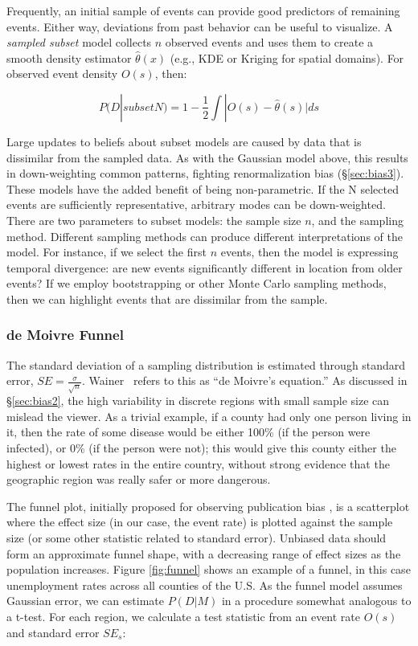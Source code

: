 \documentclass[journal]{vgtc}                %
\begin{document}
Frequently, an initial sample of events can provide good predictors of remaining events. Either way, deviations from past behavior can be useful to visualize. A \emph{sampled subset} model collects $n$ observed events and uses them to create a smooth density estimator $\hat{\theta}(x)$ (e.g., KDE or Kriging for spatial domains). For observed event density $O(s)$, then:

$$P(D|subsetN) = 1-\frac{1}{2}\int| O(s) - \hat{\theta}(s) |ds$$

Large updates to beliefs about subset models are caused by data that is dissimilar from the sampled data. As with the Gaussian model above, this results in down-weighting common patterns, fighting renormalization bias (\S\ref{sec:bias3}). These models have the added benefit of being non-parametric. If the N selected events are sufficiently representative, arbitrary modes can be down-weighted. There are two parameters to subset models: the sample size $n$, and the sampling method. Different sampling methods can produce different interpretations of the model. For instance, if we select the first $n$ events, then the model is expressing temporal divergence: are new events significantly different in location from older events? If we employ bootstrapping or other Monte Carlo sampling methods, then we can highlight events that are dissimilar from the sample.

\subsubsection{de Moivre Funnel}
\label{sec:demoivre}

\funnelFig

The standard deviation of a sampling distribution is estimated through standard error, $SE = \frac{\sigma}{\sqrt{n}}$. Wainer~\cite{wainer2007most} refers to this as ``de Moivre's equation.'' As discussed in \S\ref{sec:bias2}, the high variability in discrete regions with small sample size can mislead the viewer. As a trivial example, if a county had only one person living in it, then the rate of some disease would be either 100\% (if the person were infected), or 0\% (if the person were not); this would give this county either the highest or lowest rates in the entire country, without strong evidence that the geographic region was really safer or more dangerous.

The funnel plot, initially proposed for observing publication bias \cite{egger1997bias}, is a scatterplot where the effect size (in our case, the event rate) is plotted against the sample size (or some other statistic related to standard error). Unbiased data should form an approximate funnel shape, with a decreasing range of effect sizes as the population increases.
Figure \ref{fig:funnel} shows an example of a funnel, in this case unemployment rates across all counties of the U.S. As the funnel model assumes Gaussian error, we can estimate $P(D|M)$ in a procedure somewhat analogous to a t-test. For each region, we calculate a test statistic from an event rate $O(s)$ and standard error $SE_s$:
\end{document}
